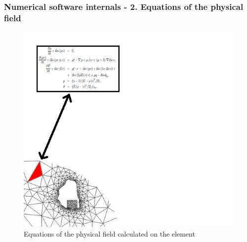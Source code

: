 \documentclass{beamer}
\begin{document}
\begin{frame}
\large
\frametitle{Numerical software internals - 2. Equations of the physical field}
\begin{figure}[!ht]
\vspace{-1mm}
\begin{center}
\includegraphics[height=0.8\textheight]{internals3.png}
\caption{Equations of the physical field calculated on the element}
\end{center}
\noindent
\vspace{-4mm}
\end{figure}
\end{frame}
\end{document}
